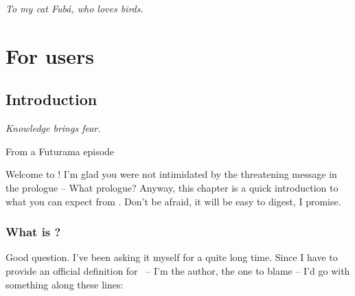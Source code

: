 \documentclass[a4paper,twoside,12pt]{memoir}
\begin{document}
\cleardoublepage

\vspace*{25em}

\begin{flushright}
\em To my cat Fubá, who loves birds.
\end{flushright}

\cleardoublepage

\tableofcontents*

\cleardoublepage

\listoffigures*

\cleardoublepage

\listoftables*

\cleardoublepage

\listofcodes*


\mainmatter

\part{For users}
\label{part:users}

\chapter{Introduction}
\label{chap:intro}

\epigraph{\emph{Knowledge brings fear.}}{From a Futurama episode}

Welcome to \arara! I'm glad you were not intimidated by the threatening message
in the prologue -- What prologue? Anyway, this chapter is a quick introduction 
to what you can expect from \arara. Don't be afraid, it will be easy to digest,
I promise.

\section{What is \texorpdfstring{\arara}{arara}?}
\label{sec:whatisarara}

Good question. I've been asking it myself for a quite long time. Since I have to
provide an official definition for \arara \ -- I'm the author, the one to blame 
-- I'd go with something along these lines:
\end{document}
